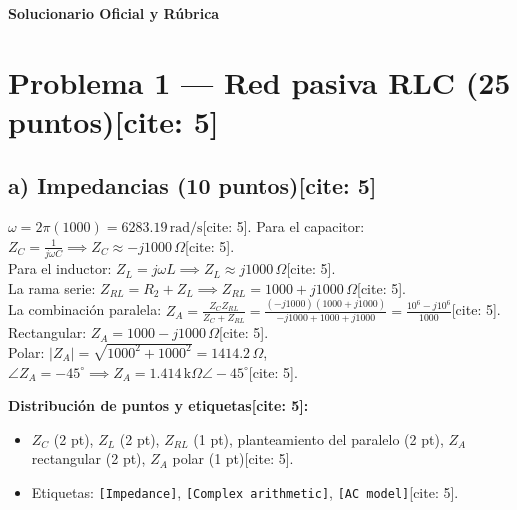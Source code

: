 \documentclass[11pt, a4paper]{article}
\begin{document}
\begin{tcolorbox}[colback=ucbblue!5!white, colframe=ucbblue, title=\textbf{Clave de Corrección: EC1 Paralelo Diferido}]
    \centering \large \textbf{Solucionario Oficial y Rúbrica}
\end{tcolorbox}

\section*{Problema 1 — Red pasiva RLC (25 puntos)[cite: 5]}

\subsection*{a) Impedancias (10 puntos)[cite: 5]}
$\omega = 2\pi(1000) = 6283.19\,\text{rad/s}$[cite: 5].
Para el capacitor: $Z_C = \frac{1}{j\omega C} \implies \boxed{Z_C \approx -j1000\,\Omega}$[cite: 5]. \\
Para el inductor: $Z_L = j\omega L \implies \boxed{Z_L \approx j1000\,\Omega}$[cite: 5]. \\
La rama serie: $Z_{RL} = R_2 + Z_L \implies \boxed{Z_{RL} = 1000 + j1000\,\Omega}$[cite: 5]. \\
La combinación paralela: 
$Z_A = \frac{Z_C Z_{RL}}{Z_C + Z_{RL}} = \frac{(-j1000)(1000+j1000)}{-j1000+1000+j1000} = \frac{10^6 - j10^6}{1000}$[cite: 5]. \\
Rectangular: $\boxed{Z_A = 1000 - j1000\,\Omega}$[cite: 5]. \\
Polar: $|Z_A| = \sqrt{1000^2 + 1000^2} = 1414.2\,\Omega$, $\angle Z_A = -45^\circ \implies \boxed{Z_A = 1.414\,\text{k}\Omega\angle-45^\circ}$[cite: 5].

\textbf{Distribución de puntos y etiquetas[cite: 5]:}
\begin{itemize}
    \item $Z_C$ (2 pt), $Z_L$ (2 pt), $Z_{RL}$ (1 pt), planteamiento del paralelo (2 pt), $Z_A$ rectangular (2 pt), $Z_A$ polar (1 pt)[cite: 5].
    \item Etiquetas: \texttt{[Impedance]}, \texttt{[Complex arithmetic]}, \texttt{[AC model]}[cite: 5].
\end{itemize}
\end{document}

